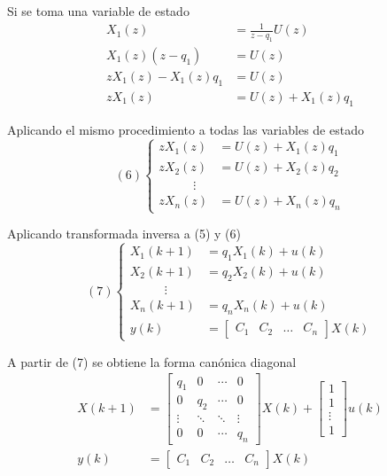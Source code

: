 Si se toma una variable de estado
\[
    \begin{split}
        X_{1}(z) & = \frac{1}{z-q_{1}}U(z) \\
        X_{1}(z)(z-q_{1}) & = U(z) \\
        zX_{1}(z) - X_{1}(z)q_{1} & = U(z) \\
        zX_{1}(z) & = U(z) + X_{1}(z)q_{1}
    \end{split}
\]

Aplicando el mismo procedimiento a todas las variables de estado
\[(6)
    \left\{
        \begin{array}{lll}
            zX_{1}(z) & = U(z) + X_{1}(z)q_{1} \\ 
            zX_{2}(z) & = U(z) + X_{2}(z)q_{2} \\
            \;\;\;\;\;\;\;\;\;\; \vdots \\
            zX_{n}(z) & = U(z) + X_{n}(z)q_{n}
        \end{array}
    \right.
\]

Aplicando transformada inversa a (5) y (6)
\[(7)
    \left\{
        \begin{array}{lll}
            X_{1}(k+1) & = q_{1}X_{1}(k) + u(k) \\ 
            X_{2}(k+1) & = q_{2}X_{2}(k) + u(k) \\
            \;\;\;\;\;\;\;\;\;\; \vdots \\
            X_{n}(k+1) & = q_{n}X_{n}(k) + u(k) \\
            y(k) & = 
            \begin{bmatrix}
                C_{1} & C_{2} & \ldots & C_{n} 
            \end{bmatrix} X(k)
        \end{array}
    \right.
\]

A partir de (7) se obtiene la forma canónica diagonal
\[
    \begin{split}
        X(k+1) & = 
        \begin{bmatrix}
            q_{1} & 0 & \cdots & 0 \\
            0 & q_{2} & \cdots & 0 \\
            \vdots & \ddots & \ddots & \vdots \\
            0 & 0 & \cdots & q_{n}
        \end{bmatrix}X(k) +
        \begin{bmatrix}
            1 \\ 1 \\ \vdots \\ 1
        \end{bmatrix}u(k) \\
        y(k) & = 
        \begin{bmatrix}
            C_{1} & C_{2} & \ldots & C_{n}   
        \end{bmatrix} X(k)
    \end{split}
\]